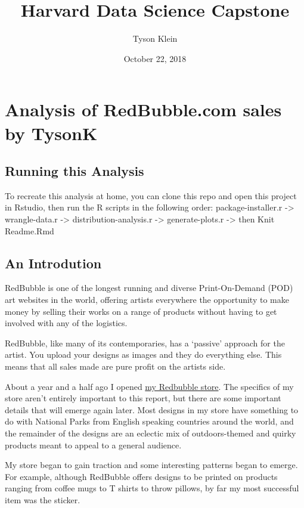 \documentclass[]{article}
\title{Harvard Data Science Capstone}
\author{Tyson Klein}
\date{October 22, 2018}
\begin{document}
\maketitle

\section{Analysis of RedBubble.com sales by
TysonK}\label{analysis-of-redbubble.com-sales-by-tysonk}

\subsection{Running this Analysis}\label{running-this-analysis}

To recreate this analysis at home, you can clone this repo and open this
project in Rstudio, then run the R scripts in the following order:
package-installer.r -\textgreater{} wrangle-data.r -\textgreater{}
distribution-analysis.r -\textgreater{} generate-plots.r -\textgreater{}
then Knit Readme.Rmd

\subsection{An Introdution}\label{an-introdution}

RedBubble is one of the longest running and diverse Print-On-Demand
(POD) art websites in the world, offering artists everywhere the
opportunity to make money by selling their works on a range of products
without having to get involved with any of the logistics.

RedBubble, like many of its contemporaries, has a `passive' approach for
the artist. You upload your designs as images and they do everything
else. This means that all sales made are pure profit on the artists
side.

About a year and a half ago I opened
\href{https://www.redbubble.com/people/tysonk?ref=account-nav-dropdown\&asc=u}{my
Redbubble store}. The specifics of my store aren't entirely important to
this report, but there are some important details that will emerge again
later. Most designs in my store have something to do with National Parks
from English speaking countries around the world, and the remainder of
the designs are an eclectic mix of outdoors-themed and quirky products
meant to appeal to a general audience.

My store began to gain traction and some interesting patterns began to
emerge. For example, although RedBubble offers designs to be printed on
products ranging from coffee mugs to T shirts to throw pillows, by far
my most successful item was the sticker.
\end{document}
